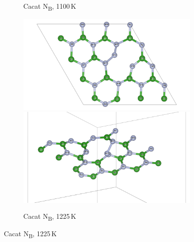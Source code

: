 \begin{figure}[htbp]
\begin{subfigure}{\textwidth}
    \caption{Cacat N\textsubscript{B}, 1100 K}
    \label{subfig:md_nn_1100k}
  \end{subfigure}
  \vspace{1em}
  \begin{subfigure}{\textwidth}
    \centering
    \includegraphics[width=0.49\linewidth]{gambar_hasil/hBN_NN_1225K.png}\hfill
    \includegraphics[width=0.49\linewidth]{gambar_hasil/hBN_NN_side_1225K.png}
    \caption{Cacat N\textsubscript{B}, 1225 K}
    \label{subfig:md_nn_1225k}
  \end{subfigure}
\end{figure}

